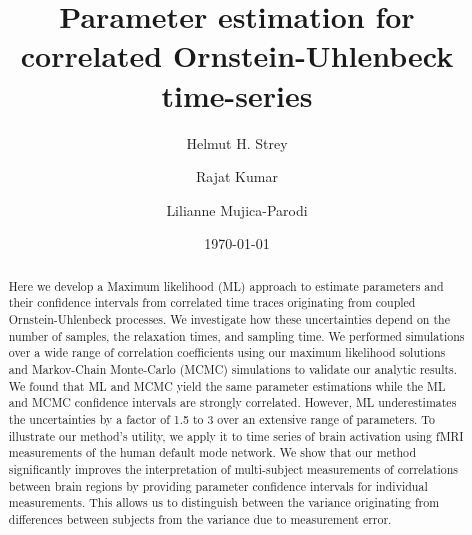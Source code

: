 \documentclass[%
 reprint,
 amsmath,amssymb,
 aps,
]{revtex4-1}
\begin{document}

\title{Parameter estimation for correlated Ornstein-Uhlenbeck time-series}

\author{Helmut H. Strey}
\author{Rajat Kumar}
\author{Lilianne Mujica-Parodi}

\date{\today}%

\begin{abstract}
Here we develop a Maximum likelihood (ML) approach to estimate parameters and their confidence intervals from correlated time traces originating from coupled Ornstein-Uhlenbeck processes.  We investigate how these uncertainties depend on the number of samples, the relaxation times, and sampling time.  We performed simulations over a wide range of correlation coefficients using our maximum likelihood solutions and Markov-Chain Monte-Carlo (MCMC) simulations to validate our analytic results.  We found that ML and MCMC yield the same parameter estimations while the ML and MCMC confidence intervals are strongly correlated. However, ML underestimates the uncertainties by a factor of 1.5 to 3 over an extensive range of parameters.  To illustrate our method's utility, we apply it to time series of brain activation using fMRI measurements of the human default mode network.  We show that our method significantly improves the interpretation of multi-subject measurements of correlations between brain regions by providing parameter confidence intervals for individual measurements.  This allows us to distinguish between the variance originating from differences between subjects from the variance due to measurement error.
\end{abstract}
\end{document}
